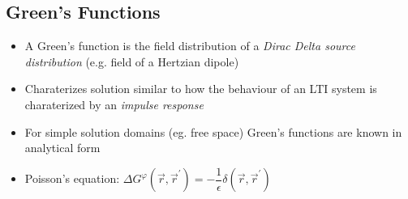 \subsection{Green's Functions}
\begin{itemize}
    \item A Green's function is the field distribution of a \textit{Dirac Delta source distribution} (e.g. field of a Hertzian dipole)
    \item Charaterizes solution similar to how the behaviour of an LTI system is charaterized by an \textit{impulse response}
    \item For simple solution domains (eg. free space) Green's functions are known in analytical form
    \item Poisson's equation: \(\Delta G^\varphi(\vec{r}, \vec{r}^\prime) = -\dfrac{1}{\epsilon}\delta(\vec{r}, \vec{r}^\prime)\)


\end{itemize}
